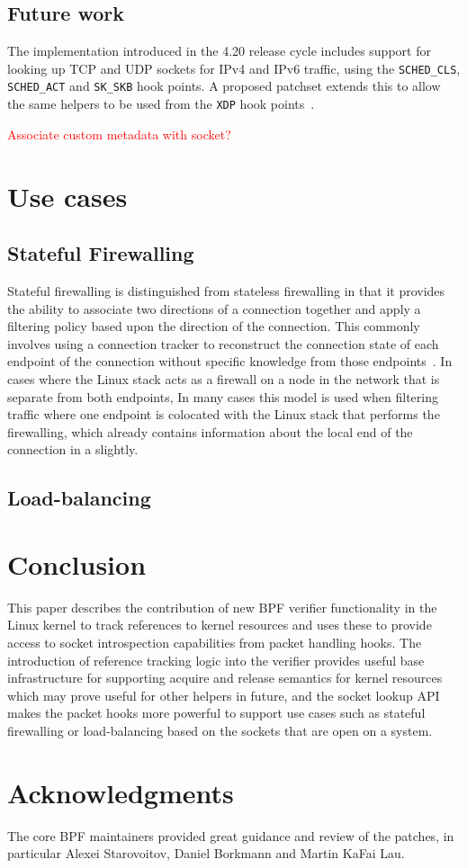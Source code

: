 \documentclass[10pt,sigconf,authorversion]{lpc}
\newcommand\todo[1]{\textcolor{red}{#1}}
\begin{document}
\subsection{Future work}

The implementation introduced in the 4.20 release cycle includes support for
looking up TCP and UDP sockets for IPv4 and IPv6 traffic, using the
\verb+SCHED_CLS+, \verb+SCHED_ACT+ and \verb+SK_SKB+ hook points. A proposed
patchset extends this to allow the same helpers to be used from the \verb+XDP+
hook points~\cite{sk-lookup-xdp}.

\todo{Associate custom metadata with socket?}

\section{Use cases}

\subsection{Stateful Firewalling}

Stateful firewalling is distinguished from stateless firewalling in that it
provides the ability to associate two directions of a connection together and
apply a filtering policy based upon the direction of the connection. This
commonly involves using a connection tracker to reconstruct the connection
state of each endpoint of the connection without specific knowledge from those
endpoints~\cite{ovs-ct,conntrack}. In cases where the Linux stack acts as a
firewall on a node in the network that is separate from both endpoints, In many
cases this model is used when filtering traffic where one endpoint is colocated
with the Linux stack that performs the firewalling, which already contains
information about the local end of the connection in a slightly.

\subsection{Load-balancing}

\section{Conclusion}

This paper describes the contribution of new BPF verifier functionality in the
Linux kernel to track references to kernel resources and uses these to provide
access to socket introspection capabilities from packet handling hooks. The
introduction of reference tracking logic into the verifier provides
useful base infrastructure for supporting acquire and release semantics for
kernel resources which may prove useful for other helpers in future, and the
socket lookup API makes the packet hooks more powerful to support use cases
such as stateful firewalling or load-balancing based on the sockets that are
open on a system.

\section{Acknowledgments}

The core BPF maintainers provided great guidance and review of the patches, in
particular Alexei Starovoitov, Daniel Borkmann and Martin KaFai Lau.



\end{document}
